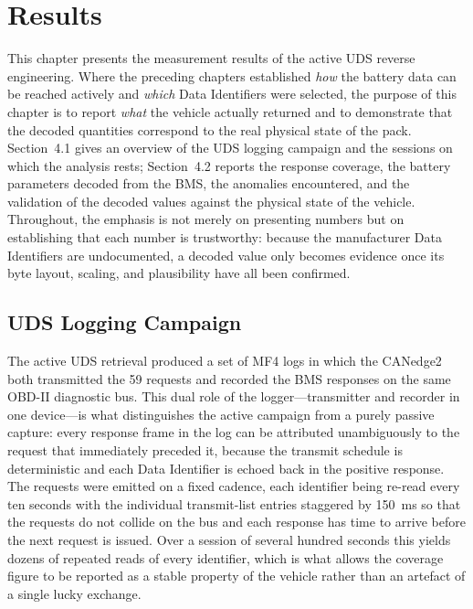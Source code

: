 \documentclass[11pt,a4paper,oneside,parskip=half]{scrreprt}
\begin{document}
\chapter{Results}
This chapter presents the measurement results of the active UDS reverse engineering. Where the preceding chapters established \emph{how} the battery data can be reached actively and \emph{which} Data Identifiers were selected, the purpose of this chapter is to report \emph{what} the vehicle actually returned and to demonstrate that the decoded quantities correspond to the real physical state of the pack. Section~4.1 gives an overview of the UDS logging campaign and the sessions on which the analysis rests; Section~4.2 reports the response coverage, the battery parameters decoded from the BMS, the anomalies encountered, and the validation of the decoded values against the physical state of the vehicle. Throughout, the emphasis is not merely on presenting numbers but on establishing that each number is trustworthy: because the manufacturer Data Identifiers are undocumented, a decoded value only becomes evidence once its byte layout, scaling, and plausibility have all been confirmed.

\section{UDS Logging Campaign}
The active UDS retrieval produced a set of MF4 logs in which the CANedge2 both transmitted the 59 requests and recorded the BMS responses on the same OBD-II diagnostic bus. This dual role of the logger---transmitter and recorder in one device---is what distinguishes the active campaign from a purely passive capture: every response frame in the log can be attributed unambiguously to the request that immediately preceded it, because the transmit schedule is deterministic and each Data Identifier is echoed back in the positive response. The requests were emitted on a fixed cadence, each identifier being re-read every ten seconds with the individual transmit-list entries staggered by 150~ms so that the requests do not collide on the bus and each response has time to arrive before the next request is issued. Over a session of several hundred seconds this yields dozens of repeated reads of every identifier, which is what allows the coverage figure to be reported as a stable property of the vehicle rather than an artefact of a single lucky exchange.
\end{document}
